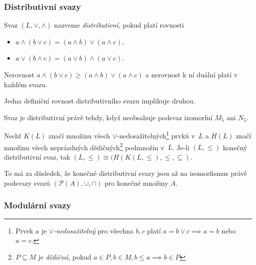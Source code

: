 \subsubsection{Distributivní svazy}

\begin{definition}
    Svaz $(L, \vee, \wedge)$ nazveme {\em distributivní},
    pokud platí rovnosti
    \begin{itemize}
        \item $a \wedge (b \vee c) = (a \wedge b) \vee (a \wedge c)$,
        \item $a \vee (b \wedge c) = (a \vee b) \wedge (a \vee c)$.
    \end{itemize}
\end{definition}

\begin{claim}
    Nerovnost
    $a \wedge (b \vee c) \geq (a \wedge b) \vee (a \wedge c)$
    a nerovnost k ní duální
    platí v každém svazu.
\end{claim}

\begin{claim}
    Jedna definiční rovnost distributivního svazu implikuje druhou.
\end{claim}

\begin{claim}
    Svaz je distributivní právě tehdy, když neobsahuje podsvaz izomorfní
    $M_5$ ani $N_5$.
\end{claim}

\begin{theorem}
    Nechť $K(L)$ značí množinu všech $\vee$-nedosažitelných\footnote{
    Prvek $a$ je {\em $\vee$-nedosažitelný} pro všechna $b,c$ platí
    $a = b \vee c \implies a = b$ nebo $a = c$.} prvků v~$L$
    a $H(L)$ značí množinu všech neprázdných dědičných\footnote{
    $P \subseteq M$ je {\em dědičná}, pokud $a \in P, b \in M, b \leq a
    \implies b \in P$} podmnožin v~$L$.
    Je-li $(L, \leq)$ konečný distributivní svaz, tak
    $(L, \leq) \cong (H(K(L, \leq), \leq, \subseteq)$.
\end{theorem}

To má za důsledek, že
konečné distributivní svazy jsou až na isomorfismus právě podsvazy
svazů $(\mathcal{P}(A), \cup, \cap)$ pro konečné množiny $A$.

\subsubsection{Modulární svazy}

